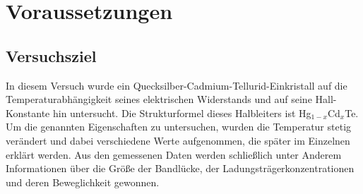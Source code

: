 \section{Voraussetzungen}

\subsection{Versuchsziel}
In diesem Versuch wurde ein Quecksilber-Cadmium-Tellurid-Einkristall auf die
Temperaturabhängigkeit seines elektrischen Widerstands und auf seine
Hall-Konstante hin untersucht. Die Strukturformel dieses Halbleiters ist
Hg$_{1-x}$Cd$_x$Te. Um die genannten Eigenschaften zu untersuchen, wurden die
Temperatur stetig verändert und dabei verschiedene Werte aufgenommen, die
später im Einzelnen erklärt werden. Aus den gemessenen Daten werden schließlich
unter Anderem Informationen über die Größe der Bandlücke, der
Ladungsträgerkonzentrationen und deren Beweglichkeit gewonnen.